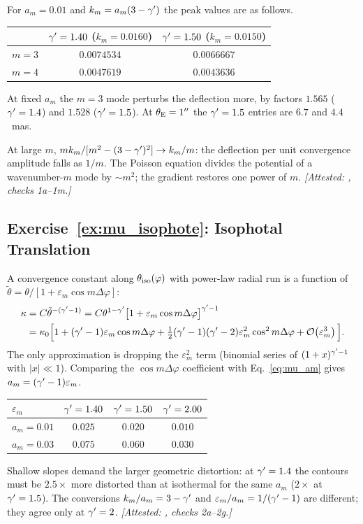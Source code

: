 For $a_m=0.01$ and $k_m = a_m(3-\gamma')$ the peak values are as follows.
\begin{center}
\begin{tabular}{@{}lcc@{}}
\toprule
 & $\gamma'=1.40$ ($k_m=0.0160$) & $\gamma'=1.50$ ($k_m=0.0150$) \\
\midrule
$m=3$ & $0.0074534$ & $0.0066667$ \\
$m=4$ & $0.0047619$ & $0.0043636$ \\
\bottomrule
\end{tabular}
\end{center}
At fixed $a_m$ the $m=3$ mode perturbs the deflection more, by factors
$1.565$ ($\gamma'=1.4$) and $1.528$ ($\gamma'=1.5$).  At $\theta_{\mathrm{E}}=1''$ the
$\gamma'=1.5$ entries are $6.7$ and $4.4$~mas.

At large $m$, $m k_m/[m^2-(3-\gamma')^2]\to k_m/m$: the deflection
per unit convergence amplitude falls as $1/m$.  The Poisson equation
divides the potential of a wavenumber-$m$ mode by $\sim m^2$; the
gradient restores one power of $m$.
\emph{[Attested: ,
checks 1a--1m.]}

\subsection*{Exercise~\ref{ex:mu_isophote}: Isophotal Translation}

A convergence constant along $\theta_{\rm iso}(\varphi)$ with power-law
radial run is a function of $\tilde\theta = \theta/[1+\varepsilon_m\cos
m\Delta\varphi]$:
\begin{align*}
    \kappa &= C\tilde\theta^{-(\gamma'-1)}
    = C\theta^{1-\gamma'}\big[1+\varepsilon_m\cos m\Delta\varphi\big]^{\gamma'-1}\\
    &= \kappa_0\Big[1+(\gamma'-1)\varepsilon_m\cos m\Delta\varphi
      + \tfrac12(\gamma'-1)(\gamma'-2)\varepsilon_m^2\cos^2 m\Delta\varphi
      + \mathcal{O}\!\left(\varepsilon_m^3\right)\Big].
\end{align*}
The only approximation is dropping the $\varepsilon_m^2$ term (binomial
series of $(1+x)^{\gamma'-1}$ with $|x|\ll1$).  Comparing the
$\cos m\Delta\varphi$ coefficient with Eq.~\eqref{eq:mu_am} gives
$a_m = (\gamma'-1)\varepsilon_m$.
\begin{center}
\begin{tabular}{@{}lccc@{}}
\toprule
$\varepsilon_m$ & $\gamma'=1.40$ & $\gamma'=1.50$ & $\gamma'=2.00$ \\
\midrule
$a_m=0.01$ & $0.025$ & $0.020$ & $0.010$ \\
$a_m=0.03$ & $0.075$ & $0.060$ & $0.030$ \\
\bottomrule
\end{tabular}
\end{center}
Shallow slopes demand the larger geometric distortion: at $\gamma'=1.4$ the
contours must be $2.5\times$ more distorted than at isothermal for the
same $a_m$ ($2\times$ at $\gamma'=1.5$).  The conversions $k_m/a_m = 3-\gamma'$ and
$\varepsilon_m/a_m = 1/(\gamma'-1)$ are different; they agree
only at $\gamma'=2$.
\emph{[Attested: ,
checks 2a--2g.]}

